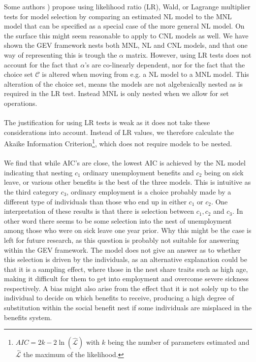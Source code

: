 Some authors \citep{hausman_specification_1984, koppelman_self_2006}) propose using likelihood ratio (LR), Wald, or Lagrange multiplier tests for model selection by comparing an estimated NL model to the MNL model that can be specified as a special case of the more general NL model. On the surface this might seem reasonable to apply to CNL models as well. We have shown the GEV framework nests both MNL, NL and CNL models, and that one way of representing this is trough the $\alpha$ matrix. However, using LR tests does not account for the fact that $\alpha$'s are co-linearly dependent, nor for the fact that the choice set $\mathcal{C}$ is altered when moving from e.g. a NL model to a MNL model. This alteration of the choice set, means the models are not algebraically nested as is required in the LR test. Instead MNL is only nested when we allow for set operations.
\\ \\
The justification for using LR tests is weak as it does not take these considerations into account. Instead of LR values, we therefore calculate the Akaike Information Criterion\footnote{$AIC = 2k - 2 \ln(\hat{\mathcal{L}})$ with $k$ being the number of parameters estimated and $\hat{\mathcal{L}}$ the maximum of the likelihood.}, which does not require models to be nested.
\\ \\
We find that while AIC's are close, the lowest AIC is achieved by the NL model indicating that nesting $c_1$ ordinary unemployment benefits and $c_2$ being on sick leave, or various other benefits is the best of the three models. This is intuitive as the third category $c_3$, ordinary employment is a choice probably made by a different type of individuals than those who end up in either $c_1$ or $c_2$. One interpretation of these results is that there is selection between $c_1,c_2$ and $c_3$. In other word there seems to be some selection into the nest of unemployment among those who were on sick leave one year prior. Why this might be the case is left for future research, as this question is probably not suitable for answering within the GEV framework.
The model does not give an answer as to whether this selection is driven by the individuals, as an alternative explanation could be that it is a sampling effect, where those in the nest share traits such as high age, making it difficult for them to get into employment and overcome severe sickness respectively. A bias might also arise from the effect that it is not solely up to the individual to decide on which benefits to receive, producing a high degree of substitution within the social benefit nest if some individuals are misplaced in the benefits system.
